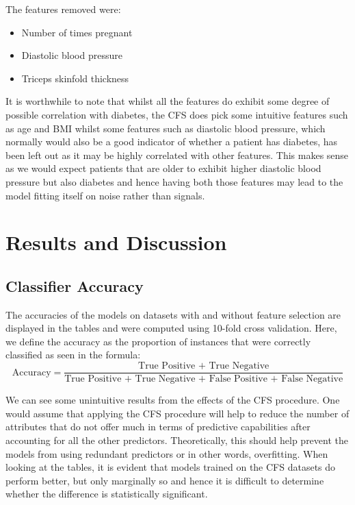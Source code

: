 \documentclass[12pt]{article}
\begin{document}
The features removed were:

\begin{itemize}
	\item Number of times pregnant
	\item Diastolic blood pressure
	\item Triceps skinfold thickness
\end{itemize}

It is worthwhile to note that whilst all the features do exhibit some degree of possible correlation with diabetes, the CFS does pick some intuitive features such as age and BMI whilst some features such as diastolic blood pressure, which normally would also be a good indicator of whether a patient has diabetes, has been left out as it may be highly correlated with other features. This makes sense as we would expect patients that are older to exhibit higher diastolic blood pressure but also diabetes and hence having both those features may lead to the model fitting itself on noise rather than signals.
\newpage

{}
\section*{Results and Discussion}

\subsection*{Classifier Accuracy}

The accuracies of the models on datasets with and without feature selection are displayed in the tables and were computed using 10-fold cross validation. Here, we define the accuracy as the proportion of instances that were correctly classified as seen in the formula:
$$
\text{Accuracy} = \frac{\text{True Positive + True Negative}}{\text{True Positive + True Negative + False Positive + False Negative}}
$$

We can see some unintuitive results from the effects of the CFS procedure. One would assume that applying the CFS procedure will help to reduce the number of attributes that do not offer much in terms of predictive capabilities after accounting for all the other predictors. Theoretically, this should help prevent the models from using redundant predictors or in other words, overfitting. When looking at the tables, it is evident that models trained on the CFS datasets do perform better, but only marginally so and hence it is difficult to determine whether the difference is statistically significant.
\end{document}
